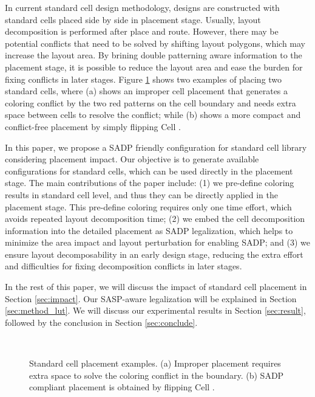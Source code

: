 In current standard cell design methodology, designs are constructed with standard cells placed side by side in placement stage. Usually, layout decomposition is performed after place and route. However, there may be potential conflicts that need to be solved by shifting layout polygons, which may increase the layout area. By brining double patterning aware information to the placement stage, it is possible to reduce the layout area and ease the burden for fixing conflicts in later stages. Figure \ref{fig:place_ex} shows two examples of placing two standard cells, where (a) shows an improper cell placement that generates a coloring conflict by the two red patterns on the cell boundary and needs extra space between cells to resolve the conflict; while (b) shows a more compact and conflict-free placement by simply flipping Cell .




In this paper, we propose a SADP friendly configuration for standard cell library considering placement impact. Our objective is to generate available configurations for standard cells, which can be used directly in the placement stage. The main contributions of the paper include: (1) we pre-define coloring results in standard cell level, and thus they can be directly applied in the placement stage. This pre-define coloring requires only one time effort, which avoids repeated layout decomposition time; 
(2) we embed the cell decomposition information into the detailed placement as SADP legalization, which helps to minimize the area impact and layout perturbation for enabling SADP; and (3) we ensure layout decomposability in an early design stage, reducing the extra effort and difficulties for fixing decomposition conflicts in later stages.



In the rest of this paper, we will discuss the impact of standard cell placement in Section \ref{sec:impact}. Our SASP-aware legalization will be explained in Section \ref{sec:method_lut}. We will discuss our experimental results in Section \ref{sec:result}, followed by the conclusion in Section \ref{sec:conclude}.

\begin{figure}[t]
\centering
\mbox{
\hspace{0.20in}
}
\caption{Standard cell placement examples. (a) Improper placement requires extra space to solve the coloring conflict in the boundary. (b) SADP compliant placement is obtained by flipping Cell .}
  \label{fig:place_ex}
\end{figure}


